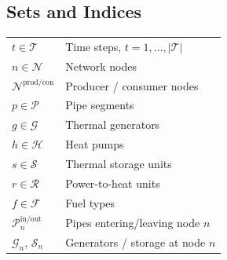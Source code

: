 \documentclass[review,3p]{elsarticle}
\begin{document}
\subsection*{Sets and Indices}
\begin{tabular}{@{}p{2.8cm}p{9.5cm}@{}}
$t \in \mathcal{T}$               & Time steps, $t = 1, \ldots, |\mathcal{T}|$ \\
$n \in \mathcal{N}$               & Network nodes \\
$\mathcal{N}^{\mathrm{prod/con}}$ & Producer / consumer nodes \\
$p \in \mathcal{P}$               & Pipe segments \\
$g \in \mathcal{G}$               & Thermal generators \\
$h \in \mathcal{H}$               & Heat pumps \\
$s \in \mathcal{S}$               & Thermal storage units \\
$r \in \mathcal{R}$               & Power-to-heat units \\
$f \in \mathcal{F}$  & Fuel types \\
$\mathcal{P}_n^{\mathrm{in/out}}$ & Pipes entering/leaving node $n$ \\
$\mathcal{G}_n,\, \mathcal{S}_n$  & Generators / storage at node $n$ \\
\end{tabular}
\end{document}
